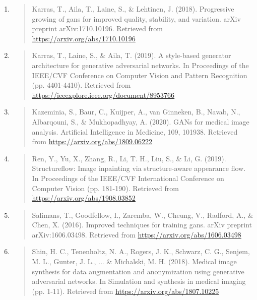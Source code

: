 \documentclass[
]{article}
\begin{document}
\begin{enumerate}
\item
  \begin{quote}
  Karras, T., Aila, T., Laine, S., \& Lehtinen, J. (2018). Progressive
  growing of gans for improved quality, stability, and variation. arXiv
  preprint arXiv:1710.10196. Retrieved from
  \href{https://arxiv.org/abs/1710.10196}{\uline{https://arxiv.org/abs/1710.10196}}
  \end{quote}

\item
  \begin{quote}
  Karras, T., Laine, S., \& Aila, T. (2019). A style-based generator
  architecture for generative adversarial networks. In Proceedings of
  the IEEE/CVF Conference on Computer Vision and Pattern Recognition
  (pp. 4401-4410). Retrieved from
  \href{https://ieeexplore.ieee.org/document/8953766}{\uline{https://ieeexplore.ieee.org/document/8953766}}
  \end{quote}

\item
  \begin{quote}
  Kazeminia, S., Baur, C., Kuijper, A., van Ginneken, B., Navab, N.,
  Albarqouni, S., \& Mukhopadhyay, A. (2020). GANs for medical image
  analysis. Artificial Intelligence in Medicine, 109, 101938. Retrieved
  from
  \href{https://arxiv.org/abs/1809.06222}{\uline{https://arxiv.org/abs/1809.06222}}
  \end{quote}

\item
  \begin{quote}
  Ren, Y., Yu, X., Zhang, R., Li, T. H., Liu, S., \& Li, G. (2019).
  Structureflow: Image inpainting via structure-aware appearance flow.
  In Proceedings of the IEEE/CVF International Conference on Computer
  Vision (pp. 181-190). Retrieved from
  \href{https://arxiv.org/abs/1908.03852}{\uline{https://arxiv.org/abs/1908.03852}}
  \end{quote}

\item
  \begin{quote}
  Salimans, T., Goodfellow, I., Zaremba, W., Cheung, V., Radford, A., \&
  Chen, X. (2016). Improved techniques for training gans. arXiv preprint
  arXiv:1606.03498. Retrieved from
  \href{https://arxiv.org/abs/1606.03498}{\uline{https://arxiv.org/abs/1606.03498}}
  \end{quote}

\item
  \begin{quote}
  Shin, H. C., Tenenholtz, N. A., Rogers, J. K., Schwarz, C. G., Senjem,
  M. L., Gunter, J. L., ... \& Michalski, M. H. (2018). Medical image
  synthesis for data augmentation and anonymization using generative
  adversarial networks. In Simulation and synthesis in medical imaging
  (pp. 1-11). Retrieved from
  \href{https://arxiv.org/abs/1807.10225}{\uline{https://arxiv.org/abs/1807.10225}}
  \end{quote}


\end{enumerate}
\end{document}
